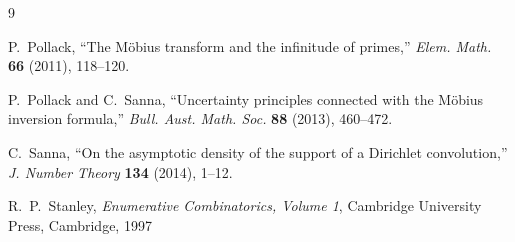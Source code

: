 \documentclass[11pt]{amsart}
\theoremstyle{myexample}
\theoremstyle{myremark}
\theoremstyle{conjecture}
\numberwithin{equation}{section}
\begin{document}
\begin{thebibliography}{9}

P.\ Pollack, ``The M\"obius transform and the infinitude of primes,'' {\sl Elem. Math.}
{\bf 66} (2011), 118--120.

P.\ Pollack and C.\ Sanna, ``Uncertainty principles connected with the M\"obius inversion formula,''
{\sl Bull. Aust. Math. Soc.} {\bf 88} (2013), 460--472.

C.\ Sanna, ``On the asymptotic density of the support of a Dirichlet convolution,'' {\sl J. Number Theory}
{\bf 134} (2014), 1--12.

R.\ P.\ Stanley, {\sl Enumerative Combinatorics, Volume 1}, Cambridge University Press, Cambridge,
1997

\end{thebibliography}
\end{document}
